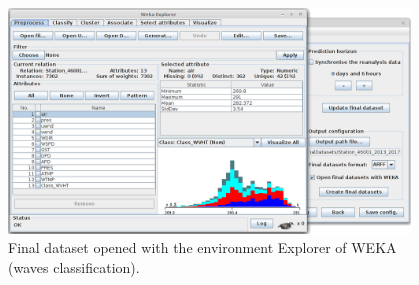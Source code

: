 \documentclass[energies,article,accept,moreauthors,pdftex]{Definitions/mdpi}
\begin{document}
\nointerlineskip
\begin{figure}[H]
				\widefigure
				\includegraphics[width=0.95\textwidth]{figures/FigureOpeningFinalDatasetWeka.png}
				\caption{Final dataset opened with the environment Explorer of WEKA (waves classification).}
				\label{fig:openigFinalDatasetWeka}
			\end{figure}
			\vspace{-6pt}
\end{document}
